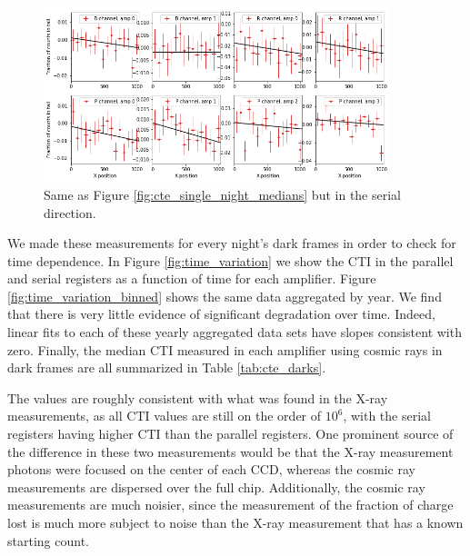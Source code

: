 \begin{figure}
    \centering
    \includegraphics[width=0.9\textwidth]{figures/cte/single_night_example_serial_medians.png}
    \caption{Same as Figure \ref{fig:cte_single_night_medians} but in the serial direction.}
    \label{fig:cte_single_night_serial_medians}
\end{figure}

We made these measurements for every night's dark frames in order to check for time dependence. In Figure \ref{fig:time_variation} we show the CTI in the parallel and serial registers as a function of time for each amplifier. Figure \ref{fig:time_variation_binned} shows the same data aggregated by year. We find that there is very little evidence of significant degradation over time. Indeed, linear fits to each of these yearly aggregated data sets have slopes consistent with zero. Finally, the median CTI measured in each amplifier using cosmic rays in dark frames are all summarized in Table \ref{tab:cte_darks}.

The values are roughly consistent with what was found in the X-ray measurements, as all CTI values are still on the order of $10^6$, with the serial registers having higher CTI than the parallel registers. One prominent source of the difference in these two measurements would be that the X-ray measurement photons were focused on the center of each CCD, whereas the cosmic ray measurements are dispersed over the full chip. Additionally, the cosmic ray measurements are much noisier, since the measurement of the fraction of charge lost is much more subject to noise than the X-ray measurement that has a known starting count.

